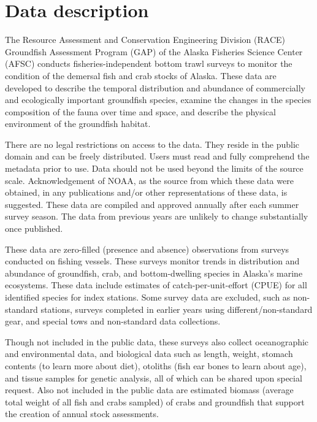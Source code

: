\documentclass[
  letterpaper,
  oneside,
  open=any]{scrbook}
\begin{document}
\hypertarget{data-description-3}{%
\section{Data description}\label{data-description-3}}

The Resource Assessment and Conservation Engineering Division (RACE)
Groundfish Assessment Program (GAP) of the Alaska Fisheries Science
Center (AFSC) conducts fisheries-independent bottom trawl surveys to
monitor the condition of the demersal fish and crab stocks of Alaska.
These data are developed to describe the temporal distribution and
abundance of commercially and ecologically important groundfish species,
examine the changes in the species composition of the fauna over time
and space, and describe the physical environment of the groundfish
habitat.

There are no legal restrictions on access to the data. They reside in
the public domain and can be freely distributed. Users must read and
fully comprehend the metadata prior to use. Data should not be used
beyond the limits of the source scale. Acknowledgement of NOAA, as the
source from which these data were obtained, in any publications and/or
other representations of these data, is suggested. These data are
compiled and approved annually after each summer survey season. The data
from previous years are unlikely to change substantially once published.

These data are zero-filled (presence and absence) observations from
surveys conducted on fishing vessels. These surveys monitor trends in
distribution and abundance of groundfish, crab, and bottom-dwelling
species in Alaska's marine ecosystems. These data include estimates of
catch-per-unit-effort (CPUE) for all identified species for index
stations. Some survey data are excluded, such as non-standard stations,
surveys completed in earlier years using different/non-standard gear,
and special tows and non-standard data collections.

Though not included in the public data, these surveys also collect
oceanographic and environmental data, and biological data such as
length, weight, stomach contents (to learn more about diet), otoliths
(fish ear bones to learn about age), and tissue samples for genetic
analysis, all of which can be shared upon special request. Also not
included in the public data are estimated biomass (average total weight
of all fish and crabs sampled) of crabs and groundfish that support the
creation of annual stock assessments.
\end{document}
